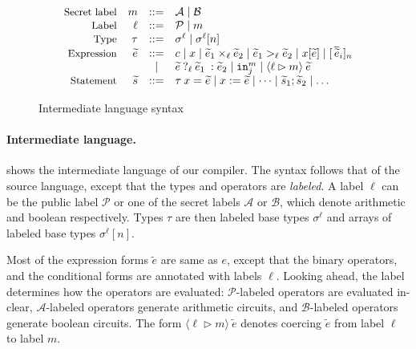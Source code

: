 \begin{figure}
  \footnotesize
  \[
  \begin{array}{rrcl}
    \text{\small{Secret label}} & m &::=& \mathcal{A} \mid \mathcal{B}\\
    \text{\small{Label}} & \ell &::=& \mathcal{P} \mid m\\
    \text{\small{Type}} & \tau &::=& \sigma^{\ell} \mid \sigma^{\ell}[n]\\
    \text{\small{Expression}} & \widetilde{e} &::=& c \mid x \mid \widetilde{e}_{1} \times_{\ell} \widetilde{e}_{2} \mid \widetilde{e}_{1} >_{\ell} \widetilde{e}_{2} \mid x[\widetilde{e}] \mid [\,\overline{\widetilde{e}}_{i}]_{n} \\
    & & \mid & {{{\widetilde{e}}}\:?_{{\ell}}\:{{\widetilde{e}}_{1}}\::{{\widetilde{e}}_{2}}} \mid {\ensuremath{\mathtt{in}}}^{m}_{j} \mid \langle \ell \rhd m \rangle\:\widetilde{e}\\
    \text{\small{Statement}} & \widetilde{s} &::=& \tau\:x = \widetilde{e} \mid x := \widetilde{e} \mid \dots \mid \widetilde{s}_{1}; \widetilde{s}_{2} \mid \dots\\
  \end{array}
  \]
\caption{Intermediate language syntax}
\label{fig:interlang}
\end{figure}

\paragraph{Intermediate language.}  shows the
intermediate language of our compiler. The syntax follows that of the source
language, except that the types and operators are \emph{labeled}. 
A label $\ell$ can be the  public label $\mathcal{P}$ or  one of the secret labels $\mathcal{A}$ or
$\mathcal{B}$, which denote arithmetic and boolean respectively.
Types $\tau$ are then
labeled base types $\sigma^{\ell}$ and arrays of labeled base types
$\sigma^{\ell}[n]$.

Most of the expression forms $\widetilde{e}$ are same as $e$, except
that the binary operators, and the conditional forms
are annotated with labels $\ell$.
Looking ahead, the label determines how the operators are
evaluated: $\mathcal{P}$-labeled operators are evaluated in-clear, $\mathcal{A}$-labeled operators generate arithmetic circuits, and
$\mathcal{B}$-labeled operators generate boolean circuits. The
form $\langle \ell \rhd m \rangle\:\widetilde{e}$ denotes coercing
$\widetilde{e}$ from label $\ell$ to label $m$.



